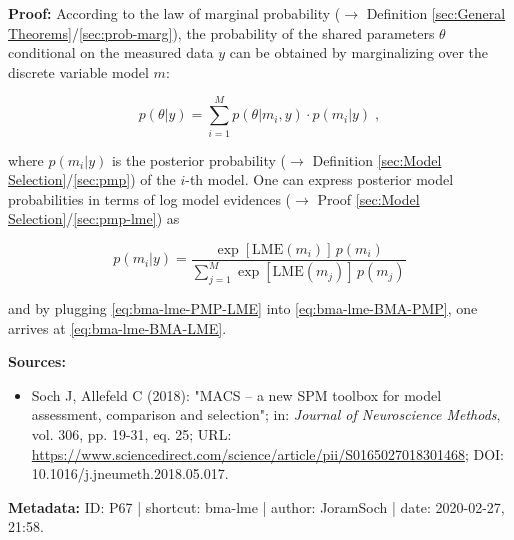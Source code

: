 \documentclass[a4paper,12pt,twoside]{book}
\begin{document}
\vspace{1em}
\textbf{Proof:} According to the law of marginal probability ($\rightarrow$ Definition \ref{sec:General Theorems}/\ref{sec:prob-marg}), the probability of the shared parameters $\theta$ conditional on the measured data $y$ can be obtained by marginalizing over the discrete variable model $m$:

\begin{equation} \label{eq:bma-lme-BMA-PMP}
p(\theta|y) = \sum_{i=1}^{M} p(\theta|m_i,y) \cdot p(m_i|y) \; ,
\end{equation}

where $p(m_i \vert y)$ is the posterior probability ($\rightarrow$ Definition \ref{sec:Model Selection}/\ref{sec:pmp}) of the $i$-th model. One can express posterior model probabilities in terms of log model evidences ($\rightarrow$ Proof \ref{sec:Model Selection}/\ref{sec:pmp-lme}) as

\begin{equation} \label{eq:bma-lme-PMP-LME}
p(m_i|y) = \frac{\exp[\mathrm{LME}(m_i)] \, p(m_i)}{\sum_{j=1}^{M} \exp[\mathrm{LME}(m_j)] \, p(m_j)}
\end{equation}

and by plugging \eqref{eq:bma-lme-PMP-LME} into \eqref{eq:bma-lme-BMA-PMP}, one arrives at \eqref{eq:bma-lme-BMA-LME}.


\vspace{1em}
\textbf{Sources:}
\begin{itemize}
\item Soch J, Allefeld C (2018): "MACS – a new SPM toolbox for model assessment, comparison and selection"; in: \textit{Journal of Neuroscience Methods}, vol. 306, pp. 19-31, eq. 25; URL: \url{https://www.sciencedirect.com/science/article/pii/S0165027018301468}; DOI: 10.1016/j.jneumeth.2018.05.017.
\end{itemize}


\vspace{1em}
\textbf{Metadata:} ID: P67 | shortcut: bma-lme | author: JoramSoch | date: 2020-02-27, 21:58.
\vspace{1em}
\end{document}
